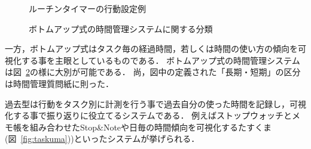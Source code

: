 \begin{figure}[hb]
	\begin{center}
		\caption{ルーチンタイマーの行動設定例\cite{RoutineTimer}}
		\label{fig:routine}
	\end{center}
\end{figure}

\begin{figure}[hb]
	\begin{center}
		\caption{ボトムアップ式の時間管理システムに関する分類}
		\label{fig:bottomup}
	\end{center}
\end{figure}

一方，ボトムアップ式はタスク毎の経過時間，若しくは時間の使い方の傾向を可視化する事を主眼としているものである．
ボトムアップ式の時間管理システムは図~\ref{fig:bottomup}の様に大別が可能である．
尚，図中の定義された「長期・短期」の区分は時間管理質問紙\cite{Britton1991}に則った．

過去型は行動をタスク別に計測を行う事で過去自分の使った時間を記録し，可視化する事で振り返りに役立てるシステムである．
例えばストップウォッチとメモ帳を組み合わせたStop\&Note\cite{pomodoro}や日毎の時間傾向を可視化するたすくま\cite{Taskuma}(図~\ref{fig:taskuma}))といったシステムが挙げられる．

